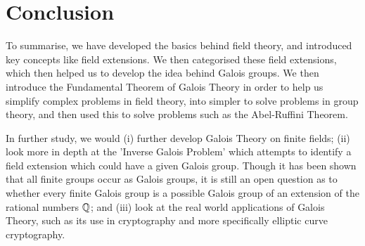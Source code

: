\section{Conclusion}
To summarise, we have developed the basics behind field theory, and introduced key concepts like field extensions. We then categorised these field extensions, which then helped us to develop the idea behind Galois groups. We then introduce the Fundamental Theorem of Galois Theory in order to help us simplify complex problems in field theory, into simpler to solve problems in group theory, and then used this to solve problems such as the Abel-Ruffini Theorem.

In further study, we would (i) further develop Galois Theory on finite fields; (ii) look more in depth at the 'Inverse Galois Problem' which attempts to identify a field extension which could have a given Galois group. Though it has been shown that all finite groups occur as Galois groups, it is still an open question as to whether every finite Galois group is a possible Galois group of an extension of the rational numbers $\mathbb Q$; and (iii) look  at the real world applications of Galois Theory, such as its use in cryptography and more specifically elliptic curve cryptography.

